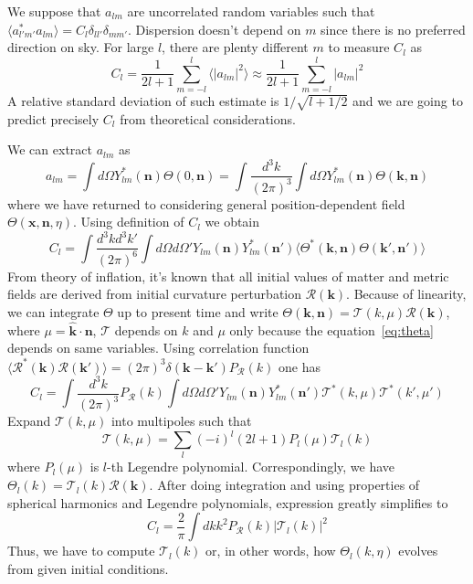 \documentclass[12pt]{extarticle}
\numberwithin{problem}{section}
\numberwithin{theorem}{section}
\begin{document}
	We suppose that $a_{lm}$ are uncorrelated random variables such that $\langle a_{l'm'}^*a_{lm}\rangle = C_l\delta_{ll'}\delta_{mm'}$. Dispersion doesn't depend on $m$ since there is no preferred direction on sky. For large $l$, there are plenty different $m$ to measure $C_l$ as
	\begin{equation}
		C_l = \frac{1}{2l+1}\sum_{m=-l}^l\langle|a_{lm}|^2\rangle\approx \frac{1}{2l+1}\sum_{m=-l}^l|a_{lm}|^2
	\end{equation}
	A relative standard deviation of such estimate is $1/\sqrt{l + 1/2}$ and we are going to predict precisely $C_l$ from theoretical considerations.
	
	We can extract $a_{lm}$ as 
	\begin{equation}
		a_{lm} = \int d\Omega Y_{lm}^*(\mathbf{n})\Theta(0, \mathbf{n}) = \int\frac{d^3k}{(2\pi)^3}\int d\Omega Y_{lm}^*(\mathbf{n})\Theta(\mathbf{k},\mathbf{n})
	\end{equation}
	where we have returned to considering general position-dependent field $\Theta(\mathbf{x}, \mathbf{n}, \eta)$. Using definition of $C_l$ we obtain
	\begin{equation}
		C_l = \int\frac{d^3k d^3k'}{(2\pi)^6}\int d\Omega d\Omega' Y_{lm}(\mathbf{n})Y_{lm}^*(\mathbf{n}')\langle\Theta^*(\mathbf{k}, \mathbf{n}) \Theta(\mathbf{k}', \mathbf{n}')\rangle
	\end{equation}
	From theory of inflation, it's known that all initial values of matter and metric fields are derived from initial curvature perturbation $\mathcal{R}(\mathbf{k})$. Because of linearity, we can integrate $\Theta$ up to present time and write $\Theta(\mathbf{k}, \mathbf{n}) = \mathcal{T}(k, \mu)\mathcal{R}(\mathbf{k})$, where $\mu = \mathbf{\hat{k}}\cdot\mathbf{n}$, $\mathcal{T}$ depends on $k$ and $\mu$ only because the equation~\ref{eq:theta} depends on same variables. Using correlation function $\langle\mathcal{R}^*(\mathbf{k})\mathcal{R}(\mathbf{k}')\rangle = (2\pi)^3\delta(\mathbf{k}-\mathbf{k}')P_\mathcal{R}(k)$ one has 
	\begin{equation}
		C_l = \int\frac{d^3k}{(2\pi)^3}P_\mathcal{R}(k)\int d\Omega d\Omega' Y_{lm}(\mathbf{n})Y_{lm}^*(\mathbf{n}')\mathcal{T}^*(k,\mu)\mathcal{T}^*(k',\mu')		
	\end{equation}
	Expand $\mathcal{T}(k, \mu)$ into multipoles such that 
	\begin{equation}
		\label{eq:transfer_l}
		\mathcal{T}(k, \mu) = \sum_l (-i)^l (2l+1) P_l(\mu) \mathcal{T}_l(k)
	\end{equation}
	where $P_l(\mu)$ is $l$-th Legendre polynomial. Correspondingly, we have $\Theta_l(k) = \mathcal{T}_l(k)\mathcal{R}(\mathbf{k})$. After doing integration and using properties of spherical harmonics and Legendre polynomials, expression greatly simplifies to 
	\begin{equation}
		C_l = \frac{2}{\pi}\int dk k^2 P_\mathcal{R}(k) |\mathcal{T}_l(k)|^2
	\end{equation}
	Thus, we have to compute $\mathcal{T}_l(k)$ or, in other words, how $\Theta_l(k, \eta)$ evolves from given initial conditions.
	
\end{document}
